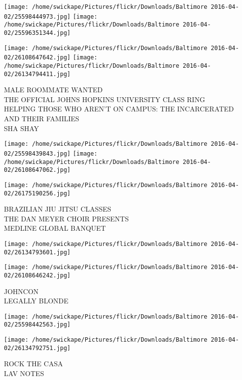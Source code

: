 \documentclass[10pt,letterpaper]{article}
\begin{document}
\texttt{[image: /home/swickape/Pictures/flickr/Downloads/Baltimore 2016-04-02/25598444973.jpg]}
\texttt{[image: /home/swickape/Pictures/flickr/Downloads/Baltimore 2016-04-02/25596351344.jpg]}

\texttt{[image: /home/swickape/Pictures/flickr/Downloads/Baltimore 2016-04-02/26108647642.jpg]}
\texttt{[image: /home/swickape/Pictures/flickr/Downloads/Baltimore 2016-04-02/26134794411.jpg]}

MALE ROOMMATE WANTED\\
THE OFFICIAL JOHNS HOPKINS UNIVERSITY CLASS RING\\
HELPING THOSE WHO AREN'T ON CAMPUS: THE INCARCERATED AND THEIR FAMILIES\\
SHA SHAY\\
\pagebreak

\texttt{[image: /home/swickape/Pictures/flickr/Downloads/Baltimore 2016-04-02/25598439843.jpg]}
\texttt{[image: /home/swickape/Pictures/flickr/Downloads/Baltimore 2016-04-02/26108647062.jpg]}

\vspace{0.25in}
\texttt{[image: /home/swickape/Pictures/flickr/Downloads/Baltimore 2016-04-02/26175190256.jpg]}

BRAZILIAN JIU JITSU CLASSES\\
THE DAN MEYER CHOIR PRESENTS\\
MEDLINE GLOBAL BANQUET\\
\pagebreak

\texttt{[image: /home/swickape/Pictures/flickr/Downloads/Baltimore 2016-04-02/26134793601.jpg]}

\vspace{0.25in}
\texttt{[image: /home/swickape/Pictures/flickr/Downloads/Baltimore 2016-04-02/26108646242.jpg]}

JOHNCON\\
LEGALLY BLONDE\\
\pagebreak

\texttt{[image: /home/swickape/Pictures/flickr/Downloads/Baltimore 2016-04-02/25598442563.jpg]}

\vspace{0.25in}
\texttt{[image: /home/swickape/Pictures/flickr/Downloads/Baltimore 2016-04-02/26134792751.jpg]}

ROCK THE CASA\\
LAV NOTES\\
\pagebreak
\end{document}
